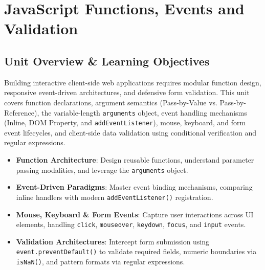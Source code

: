 \chapter{JavaScript Functions, Events and Validation}
\label{chap:javascript-functions-events-validation}

\section{Unit Overview \& Learning Objectives}

\begin{conceptbox}
Building interactive client-side web applications requires modular function design, responsive event-driven architectures, and defensive form validation. This unit covers function declarations, argument semantics (Pass-by-Value vs. Pass-by-Reference), the variable-length \texttt{arguments} object, event handling mechanisms (Inline, DOM Property, and \texttt{addEventListener}), mouse, keyboard, and form event lifecycles, and client-side data validation using conditional verification and regular expressions.
\end{conceptbox}

\begin{itemize}[leftmargin=1.5em]
    \item \textbf{Function Architecture}: Design reusable functions, understand parameter passing modalities, and leverage the \texttt{arguments} object.
    \item \textbf{Event-Driven Paradigms}: Master event binding mechanisms, comparing inline handlers with modern \texttt{addEventListener()} registration.
    \item \textbf{Mouse, Keyboard \& Form Events}: Capture user interactions across UI elements, handling \texttt{click}, \texttt{mouseover}, \texttt{keydown}, \texttt{focus}, and \texttt{input} events.
    \item \textbf{Validation Architectures}: Intercept form submission using \texttt{event.preventDefault()} to validate required fields, numeric boundaries via \texttt{isNaN()}, and pattern formats via regular expressions.
\end{itemize}

